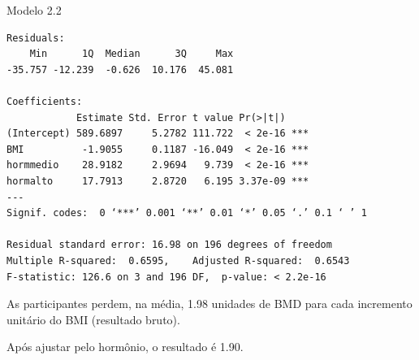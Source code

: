 \documentclass{beamer}
\begin{document}
\begin{frame}[fragile]{\scriptsize }
  \begin{center}
    \begin{exampleblock}{Modelo 2.2}
      \tiny
\begin{verbatim}
Residuals:
    Min      1Q  Median      3Q     Max 
-35.757 -12.239  -0.626  10.176  45.081 

Coefficients:
            Estimate Std. Error t value Pr(>|t|)    
(Intercept) 589.6897     5.2782 111.722  < 2e-16 ***
BMI          -1.9055     0.1187 -16.049  < 2e-16 ***
hormmedio    28.9182     2.9694   9.739  < 2e-16 ***
hormalto     17.7913     2.8720   6.195 3.37e-09 ***
---
Signif. codes:  0 ‘***’ 0.001 ‘**’ 0.01 ‘*’ 0.05 ‘.’ 0.1 ‘ ’ 1

Residual standard error: 16.98 on 196 degrees of freedom
Multiple R-squared:  0.6595,	Adjusted R-squared:  0.6543 
F-statistic: 126.6 on 3 and 196 DF,  p-value: < 2.2e-16
\end{verbatim}
    \end{exampleblock}
  \end{center}
\end{frame}

\begin{frame}{\scriptsize }
  \begin{block}{}
    \footnotesize
    As participantes perdem, na média, 1.98 unidades de BMD para cada incremento unitário do BMI (resultado bruto).

    \bigskip
    Após ajustar pelo hormônio, o resultado é 1.90.
  \end{block}
\end{frame}

\end{document}
